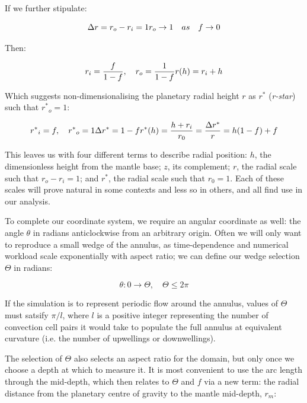 \documentclass[a4paper,11pt,oneside]{book}
\begin{document}
If we further stipulate:

\begin{equation}
\Delta r = r_{o} - r_{i} = 1 \\
r_{o} \to 1 \quad as \quad f \to 0
\end{equation}

Then:

\begin{equation}
r_i = \frac{f}{1 - f}, \quad r_o = \frac{1}{1 - f} \\
r(h) = r_i + h
\end{equation}

Which suggests non-dimensionalising the planetary radial height $r$ as $r^{*}$ (\textit{r-star}) such that ${r^{*}}_o = 1$:

\begin{equation}
{r^{*}}_i = f, \quad {r^{*}}_o = 1 \\
\Delta r^{*} = 1 - f \\
r^{*}(h) = \frac{h + r_i}{r_0} = \frac{\Delta r^{*}}{r} = h(1-f) + f
\end{equation}

This leaves us with four different terms to describe radial position: $h$, the dimensionless height from the mantle base; $z$, its complement; $r$, the radial scale such that $r_o - r_i = 1$; and $r^{*}$, the radial scale such that $r_0 = 1$. Each of these scales will prove natural in some contexts and less so in others, and all find use in our analysis.

To complete our coordinate system, we require an angular coordinate as well: the angle $\theta$ in radians anticlockwise from an arbitrary origin. Often we will only want to reproduce a small wedge of the annulus, as time-dependence and numerical workload scale exponentially with aspect ratio; we can define our wedge selection $\Theta$ in radians:

\begin{equation}
\theta: 0 \to \Theta, \quad \Theta \leq 2\pi
\end{equation}

If the simulation is to represent periodic flow around the annulus, values of $\Theta$ must satsify $\pi / l$, where $l$ is a positive integer representing the number of convection cell pairs it would take to populate the full annulus at equivalent curvature (i.e. the number of upwellings or downwellings).

The selection of $\Theta$ also selects an aspect ratio for the domain, but only once we choose a depth at which to measure it. It is most convenient to use the arc length through the mid-depth, which then relates to $\Theta$ and $f$ via a new term: the radial distance from the planetary centre of gravity to the mantle mid-depth, $r_m$:
\end{document}
